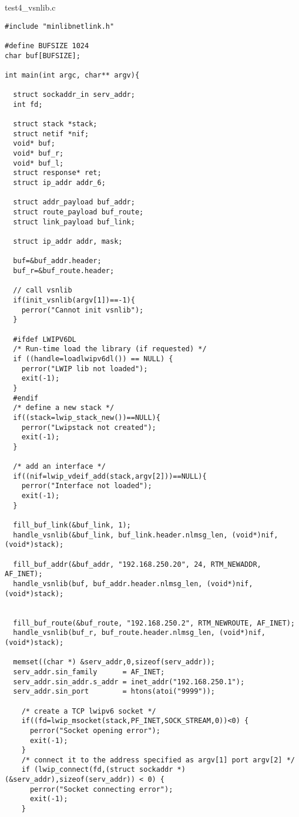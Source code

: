 test4\_vsnlib.c
\begin{lstlisting}[style=CscriptStyle]
#include "minlibnetlink.h"

#define BUFSIZE 1024
char buf[BUFSIZE];

int main(int argc, char** argv){

  struct sockaddr_in serv_addr;
  int fd;

  struct stack *stack;
  struct netif *nif;
  void* buf;
  void* buf_r;
  void* buf_l;
  struct response* ret;
  struct ip_addr addr_6;

  struct addr_payload buf_addr;
  struct route_payload buf_route;
  struct link_payload buf_link;

  struct ip_addr addr, mask;

  buf=&buf_addr.header;
  buf_r=&buf_route.header;

  // call vsnlib
  if(init_vsnlib(argv[1])==-1){
    perror("Cannot init vsnlib");
  }

  #ifdef LWIPV6DL
  /* Run-time load the library (if requested) */
  if ((handle=loadlwipv6dl()) == NULL) {
    perror("LWIP lib not loaded");
    exit(-1);
  }
  #endif
  /* define a new stack */
  if((stack=lwip_stack_new())==NULL){
    perror("Lwipstack not created");
    exit(-1);
  }

  /* add an interface */
  if((nif=lwip_vdeif_add(stack,argv[2]))==NULL){
    perror("Interface not loaded");
    exit(-1);
  }

  fill_buf_link(&buf_link, 1);
  handle_vsnlib(&buf_link, buf_link.header.nlmsg_len, (void*)nif, (void*)stack);

  fill_buf_addr(&buf_addr, "192.168.250.20", 24, RTM_NEWADDR, AF_INET);
  handle_vsnlib(buf, buf_addr.header.nlmsg_len, (void*)nif, (void*)stack);


  fill_buf_route(&buf_route, "192.168.250.2", RTM_NEWROUTE, AF_INET);
  handle_vsnlib(buf_r, buf_route.header.nlmsg_len, (void*)nif, (void*)stack);

  memset((char *) &serv_addr,0,sizeof(serv_addr));
  serv_addr.sin_family      = AF_INET;
  serv_addr.sin_addr.s_addr = inet_addr("192.168.250.1");
  serv_addr.sin_port        = htons(atoi("9999"));

    /* create a TCP lwipv6 socket */
    if((fd=lwip_msocket(stack,PF_INET,SOCK_STREAM,0))<0) {
      perror("Socket opening error");
      exit(-1);
    }
    /* connect it to the address specified as argv[1] port argv[2] */
    if (lwip_connect(fd,(struct sockaddr *)(&serv_addr),sizeof(serv_addr)) < 0) {
      perror("Socket connecting error");
      exit(-1);
    }


\end{lstlisting}

